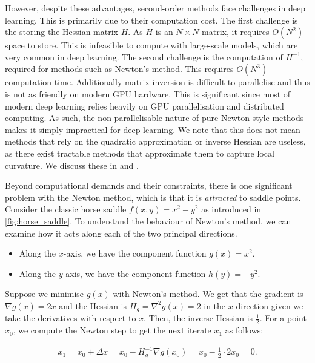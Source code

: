 However, despite these advantages, second-order methods face challenges in deep learning. This is primarily due to their computation cost. The first challenge is the storing the Hessian matrix $H$. As $H$ is an $N \times N$ matrix, it requires $O(N^2)$ space to store. This is infeasible to compute with large-scale models, which are very common in deep learning. The second challenge is the computation of $H^{-1}$, required for methods such as Newton's method. This requires $O(N^3)$ computation time. Additionally matrix inversion is difficult to parallelise and thus is not as friendly on modern GPU hardware. This is significant since most of modern deep learning relies heavily on GPU parallelisation and distributed computing. As such, the non-parallelisable nature of pure Newton-style methods makes it simply impractical for deep learning. We note that this does not mean methods that rely on the quadratic approximation or inverse Hessian are useless, as there exist tractable methods that approximate them to capture local curvature. We discuss these in  and .



Beyond computational demands and their constraints, there is one significant problem with the Newton method, which is that it is \textit{attracted} to saddle points. Consider the classic horse saddle $f(x, y) = x^2 - y^2$ as introduced in \cref{fig:horse_saddle}. To understand the behaviour of Newton's method, we can examine how it acts along each of the two principal directions. 

\begin{itemize}

    \item Along the $x$-axis, we have the component function $g(x) = x^2$. 

    \item Along the $y$-axis, we have the component function $h(y) = -y^2$.

\end{itemize}

Suppose we minimise $g(x)$ with Newton's method. We get that the gradient is $\nabla g(x) = 2x$ and the Hessian is $H_g = \nabla^2 g(x) = 2$ in the $x$-direction given we take the derivatives with respect to $x$. Then, the inverse Hessian is $\frac{1}{2}$. For a point $x_0$, we compute the Newton step to get the next iterate $x_1$ as follows:

\begin{align}

    x_1 = x_0 + \Delta x = x_0 - H_g^{-1} \nabla g(x_0) = x_0 - \frac{1}{2} \cdot 2 x_0 = 0.

\end{align}

